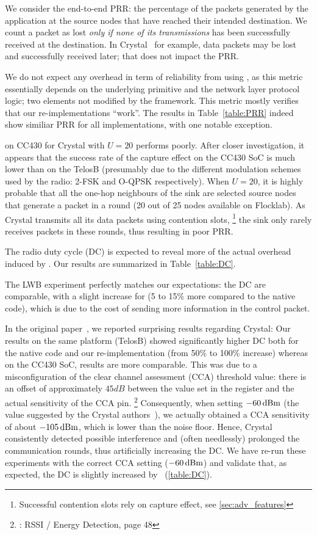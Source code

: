 We consider the end-to-end PRR: the percentage of the packets generated by the application at the source nodes that have reached their intended destination.
We count a packet as lost \textsl{only if none of its transmissions} has been successfully received at the destination. In Crystal~\cite{istomin2018Interferenceresilient} for example, data packets may be lost and successfully received later; that does not impact the PRR.

We do not expect any overhead in term of reliability from using \baloo, as this metric essentially depends on the underlying \ST primitive and the network layer protocol logic; two elements not modified by the framework.
This metric mostly verifies that our re-implementations ``work''.
The results in Table~\ref{table:PRR} indeed show similiar PRR for all implementations, with one notable exception.

\baloo on CC430 for Crystal with $U=20$ performs poorly. After closer investigation, it appears that the success rate of the capture effect on the CC430 SoC is much lower than on the TelosB (presumably due to the different modulation schemes used by the radio: 2-FSK and O-QPSK respectively).
When $U=20$, it is highly probable that all the one-hop neighbours of the sink are selected source nodes that generate a packet in a round (20 out of 25 nodes available on Flocklab).
As Crystal transmits all its data packets using contention slots,%
\footnote{Successful contention slots rely on capture effect, see \cref{sec:adv_features}}
the sink only rarely receives packets in these rounds, thus resulting in poor PRR.

The radio duty cycle (DC) is expected to reveal more of the actual overhead induced by \baloo. Our results are summarized in Table~\ref{table:DC}.

The LWB experiment perfectly matches our expectations: the DC are comparable, with a slight increase for \baloo (5 to 15\% more compared to the native code), which is due to the cost of sending more information in the control packet.

In the original \baloo paper~\cite{jacob2019Baloo}, we reported surprising results regarding Crystal: Our results on the same platform (TelosB) showed significantly higher DC both for the native code and our re-implementation (from 50\% to 100\% increase) whereas on the CC430 SoC, results are more comparable.
This was due to a misconfiguration of the clear channel assessment (CCA) threshold value: there is an offset of approximately $45dB$ between the value set in the register and the actual sensitivity of the CCA pin.%
\footnote{\cite{cc2420_datasheet}: RSSI / Energy Detection, page 48}
%
Consequently, when setting $-60\,\text{dBm}$ (the value suggested by the Crystal authors~\cite{istomin2018Interferenceresilient}), we actually obtained a CCA sensitivity of about $-105\,\text{dBm}$, which is lower than the noise floor. Hence, Crystal consistently detected possible interference and (often needlessly) prolonged the communication rounds, thus artificially increasing the DC.
We have re-run these experiments with the correct CCA setting (\ie $-60\,\text{dBm}$) and validate that, as expected, the DC is slightly increased by \baloo~(\cref{table:DC}).

